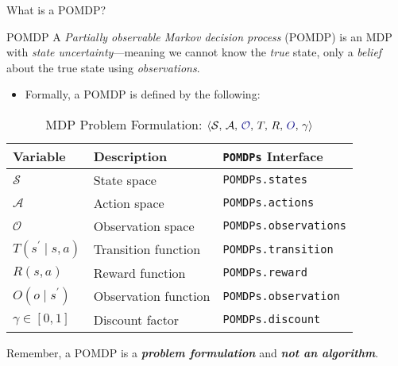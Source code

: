 
\begin{frame}[fragile]{What is a POMDP?}

{\footnotesize
\begin{definitionblock}{POMDP}
    A \textit{Partially observable Markov decision process} (POMDP) is an MDP with \textit{state uncertainty}---meaning we cannot know the \textit{true} state, only a \textit{belief} about the true state using \textit{observations}.
\end{definitionblock}
}

\phantom{}

\begin{itemize}
    \item Formally, a POMDP is defined by the following:
\end{itemize}
\begin{table}[!t]
    {\scriptsize
    \centering
    \caption{\label{tab:solutions} MDP Problem Formulation: $\langle \mathcal{S},\, \mathcal{A},\, {\color{darkblue}\mathcal{O}},\, T,\, R,\, {\color{darkblue}O},\, \gamma \rangle$}
    \begin{threeparttable}
    \begin{tabular}{lll}
        \toprule
        \textbf{Variable} & \textbf{Description} & \textbf{\texttt{POMDPs} Interface} \\
        \midrule
        $\mathcal{S}$ & State space & \texttt{POMDPs.states} \\
        $\mathcal{A}$ & Action space & \texttt{POMDPs.actions} \\
        $\mathcal{O}$ & Observation space & \texttt{POMDPs.observations} \\
        $T(s^\prime \mid s,a)$ & Transition function & \texttt{POMDPs.transition} \\
        $R(s,a)$ & Reward function & \texttt{POMDPs.reward} \\
        $O(o \mid s^\prime)$ & Observation function & \texttt{POMDPs.observation} \\
        $\gamma \in [0,1]$ & Discount factor & \texttt{POMDPs.discount} \\
        \bottomrule
    \end{tabular}
    \end{threeparttable}
    }
\end{table}

\begin{importantblock}
    {\tiny
    \begin{center}
    Remember, a POMDP is a \textit{\textbf{problem formulation}} and \textit{\textbf{not an algorithm}}.
    \end{center}
    }
\end{importantblock}

\end{frame}


